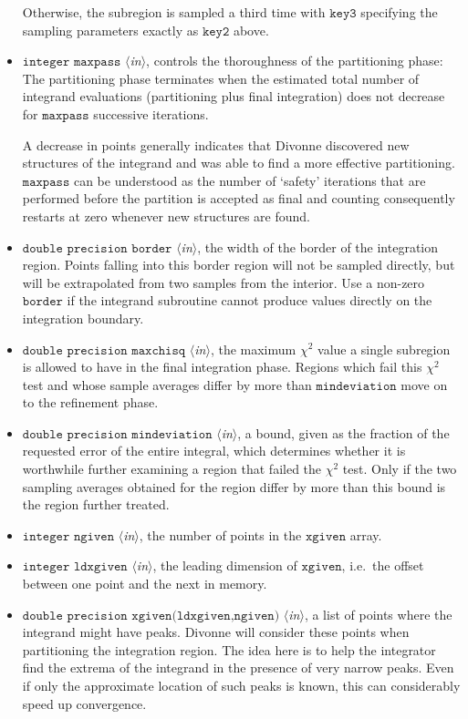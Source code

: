 \documentclass[12pt]{article}
\newcommand\ie{i.e.\ }
\newcommand\Code[1]{\ensuremath{\texttt{#1}}}
\newcommand\VarIn[1]{\item\Code{#1} \textit{$\langle$in\/$\rangle$},}
\begin{document}
\begin{itemize}
Otherwise, the subregion is sampled a third time with \Code{key3}
specifying the sampling parameters exactly as \Code{key2} above.

\VarIn{integer maxpass}
controls the thoroughness of the partitioning phase:
The partitioning phase terminates when the estimated total number of 
integrand evaluations (partitioning plus final integration) does not 
decrease for \Code{maxpass} successive iterations.

A decrease in points generally indicates that Divonne discovered new
structures of the integrand and was able to find a more effective
partitioning.  \Code{maxpass} can be understood as the number of
`safety' iterations that are performed before the partition is accepted
as final and counting consequently restarts at zero whenever new
structures are found.

\VarIn{double precision border}
the width of the border of the integration region.  Points falling into
this border region will not be sampled directly, but will be
extrapolated from two samples from the interior.  Use a non-zero 
\Code{border} if the integrand subroutine cannot produce values
directly on the integration boundary.

\VarIn{double precision maxchisq}
the maximum $\chi^2$ value a single subregion is allowed to have in the
final integration phase.  Regions which fail this $\chi^2$ test and
whose sample averages differ by more than \Code{mindeviation} move on
to the refinement phase.

\VarIn{double precision mindeviation}
a bound, given as the fraction of the requested error of the entire
integral, which determines whether it is worthwhile further examining a
region that failed the $\chi^2$ test.  Only if the two sampling averages
obtained for the region differ by more than this bound is the region
further treated.

\VarIn{integer ngiven}
the number of points in the \Code{xgiven} array.

\VarIn{integer ldxgiven}
the leading dimension of \Code{xgiven}, \ie the offset between one 
point and the next in memory.

\VarIn{double precision xgiven(ldxgiven,ngiven)}
a list of points where the integrand might have peaks.  Divonne will
consider these points when partitioning the integration region.  The
idea here is to help the integrator find the extrema of the integrand in
the presence of very narrow peaks.  Even if only the approximate
location of such peaks is known, this can considerably speed up
convergence.


\end{itemize}
\end{document}
